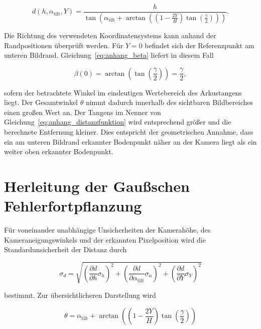 \begin{equation} 
    d(h,\alpha_{\mathrm{tilt}},Y) = \frac{h}{ \tan\left( \alpha_{\mathrm{tilt}} + \arctan\left( \left(1-\frac{2Y}{H}\right) \tan\left(\frac{\gamma}{2}\right) \right) \right) }. 
    \label{eq:anhang_distanzfunktion} 
\end{equation} 

Die Richtung des verwendeten Koordinatensystems kann anhand der Randpositionen überprüft werden. Für \(Y=0\) befindet sich der Referenzpunkt am unteren Bildrand. Gleichung~\ref{eq:anhang_beta} liefert in diesem Fall 

\begin{equation} 
    \beta(0) = \arctan\left( \tan\left(\frac{\gamma}{2}\right) \right) = \frac{\gamma}{2}, 
    \label{eq:anhang_randpruefung} 
\end{equation} 

sofern der betrachtete Winkel im eindeutigen Wertebereich des Arkustangens liegt. Der Gesamtwinkel \(\theta\) nimmt dadurch innerhalb des sichtbaren Bildbereiches einen großen Wert an. Der Tangens im Nenner von Gleichung~\ref{eq:anhang_distanzfunktion} wird entsprechend größer und die berechnete Entfernung kleiner. Dies entspricht der geometrischen Annahme, dass ein am unteren Bildrand erkannter Bodenpunkt näher an der Kamera liegt als ein weiter oben erkannter Bodenpunkt. 

\section{Herleitung der Gaußschen Fehlerfortpflanzung} 
\label{app:herleitung_fehlerfortpflanzung} 

Für voneinander unabhängige Unsicherheiten der Kamerahöhe, des Kameraneigungswinkels und der erkannten Pixelposition wird die Standardunsicherheit der Distanz durch 

\begin{equation} 
    \sigma_d = \sqrt{ \left( \frac{\partial d}{\partial h}\sigma_h \right)^2 + \left( \frac{\partial d}{\partial \alpha_{\mathrm{tilt}}} \sigma_{\alpha} \right)^2 + \left( \frac{\partial d}{\partial Y}\sigma_Y \right)^2 } 
    \label{eq:anhang_gauss} 
\end{equation} 

bestimmt\cite{Marti2010Fehlerrechnung}. Zur übersichtlicheren Darstellung wird 

\begin{equation} 
    \theta = \alpha_{\mathrm{tilt}} + \arctan\left( \left(1-\frac{2Y}{H}\right) \tan\left(\frac{\gamma}{2}\right) \right) 
    \label{eq:anhang_theta_fehler} 
\end{equation} 


